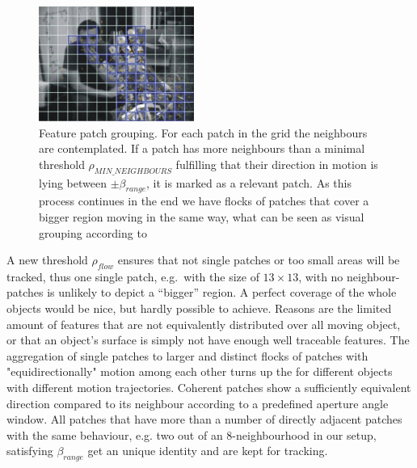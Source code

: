 \documentclass[conference]{IEEEtran}
\begin{document}
\begin{figure}
	\begin{center}
		\includegraphics[width=2in]{imgs/method/selection.ps}
		\caption[Feature patch grouping. ]{Feature patch grouping. For each patch in the grid the neighbours are contemplated. If a patch has more neighbours than a minimal threshold $\rho_{MIN\_NEIGHBOURS}$ fulfilling that their direction in motion is lying between $\pm \beta_{range}$, it is marked as a relevant patch. As this process continues in the end we have flocks of patches that cover a bigger region moving in the same way, what can be seen as visual grouping according to \cite{ULGII23} }
		\label{fig:flocking}
	\end{center}
\end{figure}
%
A new threshold $\rho_{flow}$ ensures that not single patches or too small areas will be tracked, thus one single patch, e.g.\ with the size of $13 \times 13$, with no neighbour-patches is unlikely to depict a ``bigger'' region. A perfect coverage of the whole objects would be nice, but hardly possible to achieve. Reasons are the limited amount of features that are not equivalently distributed over all moving object, or that an object's surface is simply not have enough well traceable features. The aggregation of single patches to larger and distinct flocks of patches with "equidirectionally" motion among each other %
turns up the for different objects with different motion trajectories. Coherent patches show a sufficiently equivalent direction compared to its neighbour according to a predefined aperture angle window. All patches that have more than a number of directly adjacent patches with the same behaviour, e.g. two out of an 8-neighbourhood in our setup, satisfying  $\beta_{range}$ get an unique identity and are kept for tracking.
\end{document}
